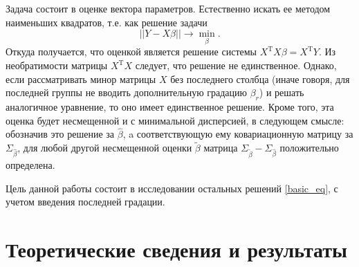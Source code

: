 \documentclass{spisok-article}
\theoremstyle{definition}
\begin{document}
Задача состоит в оценке вектора параметров. Естественно искать ее методом наименьших квадратов, т.е. как решение задачи
\begin{equation}\label{basic_eq}
||Y - X\beta|| \to \min_\beta.
\end{equation}
Откуда получается, что оценкой является решение системы $X^ \mathrm{T} X\beta = X^\mathrm{T}Y$. Из необратимости матрицы $X^ \mathrm{T} X$ следует, что решение не единственное. Однако, если рассматривать минор матрицы $X$ без последнего столбца (иначе говоря, для последней группы не вводить дополнительную градацию $\beta_r$) и решать аналогичное уравнение, то оно имеет единственное решение. Кроме того, эта оценка будет несмещенной и с минимальной дисперсией\cite{demid}, в следующем смысле: обозначив это решение за $\hat{\beta}$, a соответствующую ему ковариационную матрицу за $\Sigma_{\hat{\beta}}$, для любой другой несмещенной оценки $\tilde{\beta}$ матрица $\Sigma_{\tilde{\beta}}-\Sigma_{\hat{\beta}}$ положительно определена.

Цель данной работы состоит в исследовании остальных решений \eqref{basic_eq}, с учетом введения последней градации.
\section{Теоретические сведения и результаты}
\end{document}
